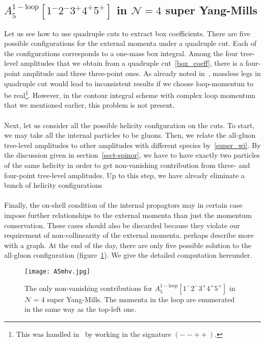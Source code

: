\subsection{$A_5^{\mathrm{1-loop}}[1^-2^-3^+4^+5^+]$ in $\mathcal{N}=4$ super Yang-Mills}
Let us see how to use quadruple cuts to extract box coefficients. 
There are five possible configurations for the external momenta under a quadruple cut.
Each of the configurations corresponds to a one-mass box integral.
Among the four tree-level amplitudes that we obtain from a quadruple cut~\cref{box_coeff}, there is a four-point amplitude and three three-point ones.
As already noted in~\cite{Britto:2004nc}, massless legs in quadruple cut would lead to inconsistent results if we choose loop-momentun to be real\footnote{This was handled in~\cite{Britto:2004nc} by working in the signature $(--++)$.}. 
However, in the contour integral scheme with complex loop momentum that we mentioned earlier, this problem is not present.
\\\\
Next, let us consider all the possible helicity configuration on the cuts.
To start, we may take all the internal particles to be gluons. 
Then, we relate the all-gluon tree-level amplitudes to other amplitudes with different species by~\cref{super_wi}. 
By the discussion given in section~\ref{sect-spinor}, we have to have exactly two particles of the same helicity in order to get non-vanishing contribution from three- and four-point tree-level amplitudes.
Up to this step, we have already eliminate a bunch of helicity configurations
\\\\
Finally, the on-shell condition of the internal propagtors may in certain case impose further relationships to the external momenta than just the momentum conservation.
These cases should also be discarded because they violate our requirement of non-collinearity of the external momenta. 
\color{red}perhaps describe more with a graph.\color{black}
At the end of the day, there are only five possible solution to the all-gluon configuration (figure~\ref{fig-a5mhv}).
We give the detailed computation hereunder.
\begin{figure}
  \centering
  \texttt{[image: A5mhv.jpg]}
  \caption{The only non-vanishing contributions for $A_5^{\mathrm{1-loop}}[1^-2^-3^+4^+5^+]$ in $\mathcal{N}=4$ super Yang-Mills. The momenta in the loop are enumerated in the same way as the top-left one.}
  \label{fig-a5mhv}
\end{figure}
